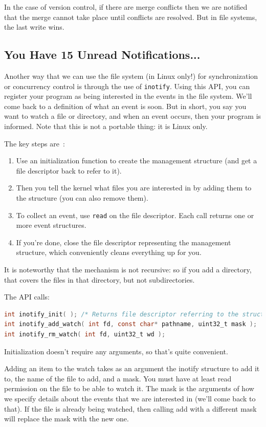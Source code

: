 In the case of version control, if there are merge conflicts then we are notified that the merge cannot take place until conflicts are resolved. But in file systems, the last write wins.

\subsection*{You Have 15 Unread Notifications...}

Another way that we can use the file system (in Linux only!) for synchronization or concurrency control is through the use of \texttt{inotify}. Using this API, you can register your program as being interested in the events in the file system. We'll come back to a definition of what an event is soon. But in short, you say you want to watch a file or directory, and when an event occurs, then your program is informed. Note that this is not a portable thing: it is Linux only.

The key steps are~\cite{lpi}:
\begin{enumerate}
	\item Use an initialization function to create the management structure (and get a file descriptor back to refer to it).
	\item Then you tell the kernel what files you are interested in by adding them to the structure (you can also remove them).
	\item To collect an event, use \texttt{read} on the file descriptor. Each call returns one or more event structures.
	\item If you're done, close the file descriptor representing the management structure, which conveniently cleans everything up for you.
\end{enumerate}

It is noteworthy that the mechanism is not recursive: so if you add a directory, that covers the files in that directory, but not subdirectories.

The API calls:
\begin{lstlisting}[language=C]
int inotify_init( ); /* Returns file descriptor referring to the struct */
int inotify_add_watch( int fd, const char* pathname, uint32_t mask );
int inotify_rm_watch( int fd, uint32_t wd );
\end{lstlisting}

Initialization doesn't require any arguments, so that's quite convenient.

Adding an item to the watch takes as an argument the inotify structure to add it to, the name of the file to add, and a mask. You must have at least read permission on the file to be able to watch it. The mask is the arguments of how we specify details about the events that we are interested in (we'll come back to that). If the file is already being watched, then calling add with a different mask will replace the mask with the new one.


